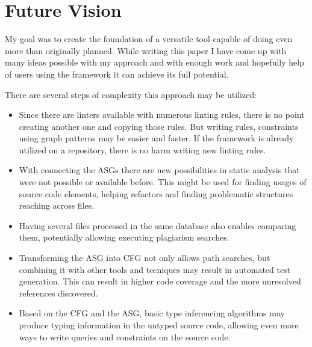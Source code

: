 \chapter{Future Vision}
\label{chap:future-vision}

My goal was to create the foundation of a versatile tool capable of doing even more than originally planned. While writing this paper I have come up with many ideas possible with my approach and with enough work and hopefully help of users using the framework it can achieve its full potential.

There are several steps of complexity this approach may be utilized:

\begin{itemize}[topsep=0pt]
  \item Since there are linters available with numerous linting rules, there is no point creating another one and copying those rules. But writing rules, constraints using graph patterns may be easier and faster. If the framework is already utilized on a repository, there is no harm writing new linting rules.

  \item With connecting the ASGs there are new possibilities in static analysis that were not possible or available before. This might be used for finding usages of source code elements, helping refactors and finding problematic structures reaching across files.

  \item Having several files processed in the same database also enables comparing them, potentially allowing executing plagiarism searches.

  \item Transforming the ASG into CFG not only allows path searches, but combining it with other tools and tecniques may result in automated test generation. This can result in higher code coverage and the more unresolved references discovered.

  \item Based on the CFG and the ASG, basic type inferencing algorithms may produce typing information in the untyped source code, allowing even more ways to write queries and constraints on the source code.
\end{itemize}

